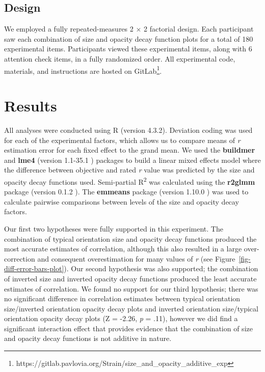 \documentclass[sigconf]{acmart}
\begin{document}
\hypertarget{sec-design}{%
\subsection{Design}\label{sec-design}}

We employed a fully repeated-measures 2 \(\times\) 2 factorial design.
Each participant saw each combination of size and opacity decay function
plots for a total of 180 experimental items. Participants viewed these
experimental items, along with 6 attention check items, in a fully
randomized order. All experimental code, materials, and instructions are
hosted on GitLab\footnote{https://gitlab.pavlovia.org/Strain/size\_and\_opacity\_additive\_exp}.

\hypertarget{sec-results}{%
\section{Results}\label{sec-results}}

All analyses were conducted using R (version 4.3.2). Deviation coding
was used for each of the experimental factors, which allows us to
compare means of \emph{r} estimation error for each fixed effect to the
grand mean. We used the \textbf{buildmer} and \textbf{lme4} (version
1.1-35.1 \citep{lme4}) packages to build a linear mixed effects model
where the difference between objective and rated \emph{r} value was
predicted by the size and opacity decay functions used. Semi-partial
R\textsuperscript{2} was calculated using the \textbf{r2glmm} package
(version 0.1.2 \citep{r2glmm}). The \textbf{emmeans} package (version
1.10.0 \citep{emmeans}) was used to calculate pairwise comparisons
between levels of the size and opacity decay factors.

Our first two hypotheses were fully supported in this experiment. The
combination of typical orientation size and opacity decay functions
produced the most accurate estimates of correlation, although this also
resulted in a large over-correction and consequent overestimation for
many values of \emph{r} (see Figure~\ref{fig-diff-error-bars-plot}). Our
second hypothesis was also supported; the combination of inverted size
and inverted opacity decay functions produced the least accurate
estimates of correlation. We found no support for our third hypothesis;
there was no significant difference in correlation estimates between
typical orientation size/inverted orientation opacity decay plots and
inverted orientation size/typical orientation opacity decay plots (Z =
-2.26, \emph{p} = .11), however we did find a significant interaction
effect that provides evidence that the combination of size and opacity
decay functions is not additive in nature.
\end{document}
